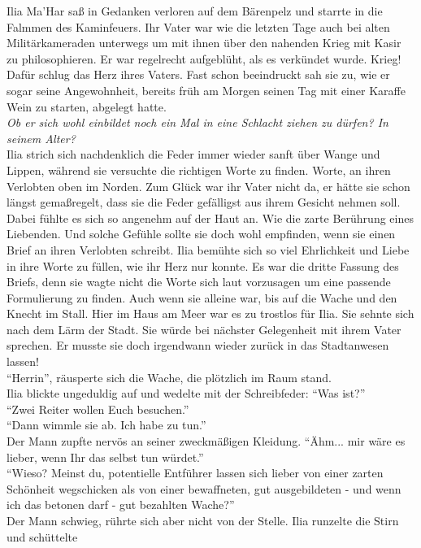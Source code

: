 Ilia Ma'Har saß in Gedanken verloren auf dem Bärenpelz und starrte in die Falmmen des Kaminfeuers. 
Ihr Vater war wie die letzten Tage auch bei alten Militärkameraden unterwegs um mit ihnen über den 
nahenden Krieg mit Kasir zu philosophieren. Er war regelrecht aufgeblüht, als es verkündet wurde. 
Krieg! Dafür schlug das Herz ihres Vaters. Fast schon beeindruckt sah sie zu, wie er sogar seine 
Angewohnheit, bereits früh am Morgen seinen Tag mit einer Karaffe Wein zu starten, abgelegt hatte.\\
\textit{Ob er sich wohl einbildet noch ein Mal in eine Schlacht ziehen zu dürfen? In seinem 
Alter?}\\
Ilia strich sich nachdenklich die Feder immer wieder sanft über Wange und Lippen, während sie 
versuchte die richtigen Worte zu finden. Worte, an ihren Verlobten oben im Norden. Zum Glück war 
ihr Vater nicht da, er hätte sie schon längst gemaßregelt, dass sie die Feder gefälligst aus ihrem 
Gesicht nehmen soll. Dabei fühlte es sich so angenehm auf der Haut an. Wie die zarte Berührung 
eines Liebenden. Und solche Gefühle sollte sie doch wohl empfinden, wenn sie einen Brief an ihren 
Verlobten schreibt. Ilia bemühte sich so viel Ehrlichkeit und Liebe in ihre Worte zu füllen, wie 
ihr Herz nur konnte. Es war die dritte Fassung des Briefs, denn sie wagte nicht die Worte sich laut 
vorzusagen um eine passende Formulierung zu finden. Auch wenn sie alleine war, bis auf die Wache 
und den Knecht im Stall. Hier im Haus am Meer war es zu trostlos für Ilia. Sie sehnte sich nach dem 
Lärm der Stadt. Sie würde bei nächster Gelegenheit mit ihrem Vater sprechen. Er musste sie doch 
irgendwann wieder zurück in das Stadtanwesen lassen!\\
``Herrin'', räusperte sich die Wache, die plötzlich im Raum stand.\\
Ilia blickte ungeduldig auf und wedelte mit der Schreibfeder: ``Was ist?''\\
``Zwei Reiter wollen Euch besuchen.''\\
``Dann wimmle sie ab. Ich habe zu tun.''\\
Der Mann zupfte nervös an seiner zweckmäßigen Kleidung. ``Ähm... mir wäre es lieber, wenn Ihr das 
selbst tun würdet.''\\
``Wieso? Meinst du, potentielle Entführer lassen sich lieber von einer zarten Schönheit wegschicken 
als von einer bewaffneten, gut ausgebildeten - und wenn ich das betonen darf - gut bezahlten 
Wache?''\\
Der Mann schwieg, rührte sich aber nicht von der Stelle. Ilia runzelte die Stirn und schüttelte 
